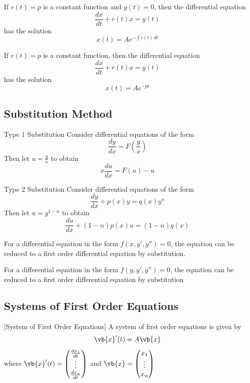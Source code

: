 \documentclass[a4paper]{article}
\begin{document}
\begin{crl}{}{} If $r(t)=p$ is a constant function and $g(t)=0$, then the differential equation $$\frac{dx}{dt}+r(t)x=g(t)$$ has the solution $$x(t)=Ae^{-\int r(t)\,dt}$$
\end{crl}

\begin{crl}{}{} If $r(t)=p$ is a constant function, then the differential equation $$\frac{dx}{dt}+r(t)x=g(t)$$ has the solution $$x(t)=Ae^{-pt}$$
\end{crl}

\subsection{Substitution Method}
\begin{thm}{Type 1 Substitution}{} Consider differential equations of the form $$\frac{dy}{dx}=F\left(\frac{y}{x}\right)$$ Then let $u=\frac{y}{x}$ to obtain $$x\frac{du}{dx}=F(u)-u$$
\end{thm}

\begin{thm}{Type 2 Substitution}{} Consider differential equations of the form $$\frac{dy}{dx}+p(x)y=q(x)y^n$$ Then let $u=y^{1-n}$ to obtain $$\frac{du}{dx}+(1-n)p(x)u=(1-n)q(x)$$
\end{thm}

\begin{prp}{}{} For a differential equation in the form $f(x,y',y'')=0$, the equation can be reduced to a first order differential equation by substitution. 
\end{prp}

\begin{prp}{}{} For a differential equation in the form $f(y,y',y'')=0$, the equation can be reduced to a first order differential equation by substitution
\end{prp}

\subsection{Systems of First Order Equations}
\begin{defn}{}{}[System of First Order Equations] A system of first order equations is given by $$\vb{x}'(t)=A\vb{x}$$ where $\vb{x}'(t)=\begin{pmatrix}\frac{dx_1}{dt}\\\vdots\\\frac{dx_n}{dt}\end{pmatrix}$ and $\vb{x}=\begin{pmatrix}x_1\\\vdots\\x_n\end{pmatrix}$
\end{defn}
\end{document}
